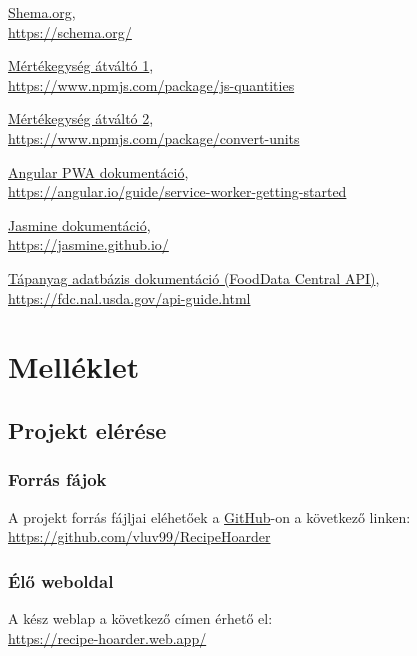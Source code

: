 \documentclass[12pt]{report}
\theoremstyle{definition}
\begin{document}
\begin{thebibliography}{9}
	\href{https://schema.org/}{Shema.org}, \\
	\url{https://schema.org/}

	\href{https://www.npmjs.com/package/js-quantities}{Mértékegység átváltó 1}, \\
	\url{https://www.npmjs.com/package/js-quantities}

	\href{https://www.npmjs.com/package/convert-units}{Mértékegység átváltó 2}, \\
	\url{https://www.npmjs.com/package/convert-units}

	\href{https://angular.io/guide/service-worker-getting-started}{Angular PWA dokumentáció}, \\
	\url{https://angular.io/guide/service-worker-getting-started}

	\href{https://jasmine.github.io/}{Jasmine dokumentáció}, \\
	\url{https://jasmine.github.io/}

	\href{https://fdc.nal.usda.gov/api-guide.html}{Tápanyag adatbázis dokumentáció (FoodData Central API)}, \\
	\url{https://fdc.nal.usda.gov/api-guide.html}

\end{thebibliography}

\chapter{Melléklet} 

\section{Projekt elérése}

\subsection{Forrás fájok}
A projekt forrás fájljai eléhetőek a \href{https://github.com/vluv99/RecipeHoarder}{GitHub}-on a következő linken:\\
\url{https://github.com/vluv99/RecipeHoarder}

\subsection{Élő weboldal}
A kész weblap a következő címen érhető el:\\
\url{https://recipe-hoarder.web.app/}

\printglossary[title=Szótár]
\end{document}
